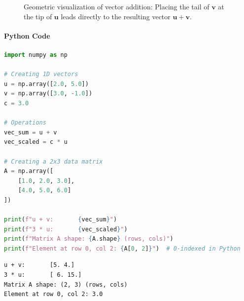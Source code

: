 \begin{figure}[htbp]
\centering
{}
\caption{Geometric visualization of vector addition: Placing the tail of $\mathbf{v}$ at the tip of $\mathbf{u}$ leads directly to the resulting vector $\mathbf{u} + \mathbf{v}$.}\label{fig:vector_addition}
\end{figure}

\paragraph{Python Code}
\begin{lstlisting}[language=Python]
import numpy as np

# Creating 1D vectors
u = np.array([2.0, 5.0])
v = np.array([3.0, -1.0])
c = 3.0

# Operations
vec_sum = u + v
vec_scaled = c * u

# Creating a 2x3 data matrix
A = np.array([
    [1.0, 2.0, 3.0],
    [4.0, 5.0, 6.0]
])

print(f"u + v:       {vec_sum}")
print(f"3 * u:       {vec_scaled}")
print(f"Matrix A shape: {A.shape} (rows, cols)")
print(f"Element at row 0, col 2: {A[0, 2]}")  # 0-indexed in Python
\end{lstlisting}

\begin{lstlisting}[style=outputstyle]
u + v:       [5. 4.]
3 * u:       [ 6. 15.]
Matrix A shape: (2, 3) (rows, cols)
Element at row 0, col 2: 3.0
\end{lstlisting}

